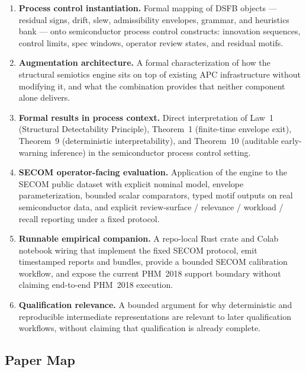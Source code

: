 \documentclass[11pt,letterpaper]{article}
\theoremstyle{scresult}
\begin{document}
\begin{enumerate}
  \item \textbf{Process control instantiation.} Formal mapping of DSFB
        objects --- residual signs, drift, slew, admissibility envelopes,
        grammar, and heuristics bank --- onto semiconductor process control
        constructs: innovation sequences, control limits, spec windows,
        operator review states, and residual motifs.

  \item \textbf{Augmentation architecture.} A formal characterization of
        how the structural semiotics engine sits on top of existing APC
        infrastructure without modifying it, and what the combination
        provides that neither component alone delivers.

  \item \textbf{Formal results in process context.} Direct interpretation
        of Law~1 (Structural Detectability Principle), Theorem~1
        (finite-time envelope exit), Theorem~9 (deterministic
        interpretability), and Theorem~10 (auditable early-warning
        inference) in the semiconductor process control setting.

  \item \textbf{SECOM operator-facing evaluation.} Application of the engine
        to the SECOM public dataset with explicit nominal model, envelope
        parameterization, bounded scalar comparators, typed motif outputs on
        real semiconductor data, and explicit review-surface / relevance /
        workload / recall reporting under a fixed protocol.

  \item \textbf{Runnable empirical companion.} A repo-local Rust crate and
        Colab notebook wiring that implement the fixed SECOM protocol, emit
        timestamped reports and bundles, provide a bounded SECOM calibration
        workflow, and expose the current PHM~2018 support boundary without
        claiming end-to-end PHM~2018 execution.

  \item \textbf{Qualification relevance.} A bounded argument for why
        deterministic and reproducible intermediate representations are
        relevant to later qualification workflows, without claiming that
        qualification is already complete.
\end{enumerate}

\subsection{Paper Map}
\end{document}
